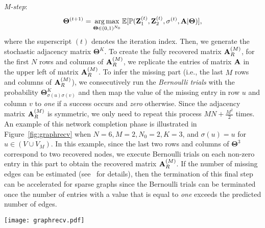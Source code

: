 \documentclass[format=acmsmall, review=false, screen=true]{acmart}
\newcommand{\argmax}{\mathop{\mathrm{arg\,max}}}
\begin{document}
\textit{M-step}:
\begin{equation*}
\bm{\Theta}^{(t+1)} = \argmax_{\bm{\Theta} \in (0,1)^{N_0}} \mathbb{E}[\mathbb{P}({\bf Z}_1^{(t)},{\bf Z}_2^{(t)},\sigma^{(t)},{\bf A}| \bm{\Theta})], 
\end{equation*}
where the superscript $(t)$ denotes the iteration index.
Then, we generate the stochastic adjacency matrix $\bm{\Theta}^K$. To create the fully recovered matrix ${\bf A}^{(M)}_R$, for the first $N$ rows and columns of ${\bf A}_R^{(M)}$, we replicate the entries of matrix ${\bf A}$ in the upper left of matrix ${\bf A}^{(M)}_R$. To infer the missing part (i.e., the last $M$ rows and columns of ${\bf A}_R^{(M)}$), we consecutively run the {\em Bernoulli trials} with the probability $\bm{\Theta}^K_{\sigma(u)\sigma(v)}$ and then map the value of the missing entry in row $u$ and column $v$ to \textit{one} if a success occurs and {\em zero} otherwise. Since the adjacency matrix ${\bf A}_R^{(M)}$ is symmetric, we only need to repeat this process $MN + \frac{M^2}{2}$ times. An example of this network completion phase is illustrated in Figure~\ref{fig:graphrecv} when $N = 6, M = 2, N_0 = 2, K = 3$, and $\sigma(u) = u$ for $u \in (V \cup V_{M})$. In this example, since the last two rows and columns of $\bm{\Theta}^3$ correspond to two recovered nodes, we execute Bernoulli trials on each non-zero entry in this part to obtain the recovered matrix ${\bf A}_R^{(M)}$. If the number of missing edges can be estimated (see~\cite{kronem} for details), then the termination of this final step can be accelerated for sparse graphs since the Bernoulli trials can be terminated once the number of entries with a value that is equal to \textit{one} exceeds the predicted number of edges.
\begin{figure*}[t]
    \begin{center}
            \texttt{[image: graphrecv.pdf]}
            \caption{{An illustration of the recovery phase in our \textsf{KroMFac} framework. Here, parameters are set to the following values: $N = 6, M = 2, N_0 = 2, K = 3$, and $\sigma(u) = u$ for $u \in (V \cup V_{M})$.}}
            \label{fig:graphrecv}
    \end{center}
\vspace{-0.1in}
\end{figure*}
\end{document}
